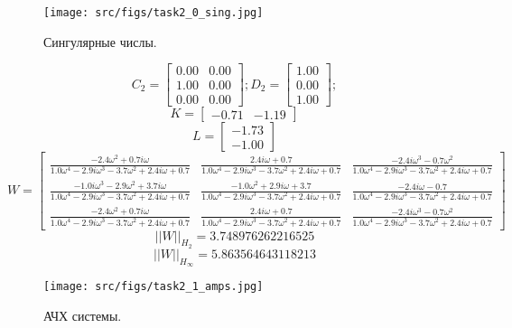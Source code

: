   \begin{figure}[ht!]
    \centering
    \texttt{[image: src/figs/task2\_0\_sing.jpg]}
    \caption{Сингулярные числы.}
    \label{fig:task2_0_sing}
  \end{figure}
  

  \[C_2 = \begin{bmatrix}
    0.00 &  0.00\\
    1.00 &  0.00\\
    0.00 &  0.00
  \end{bmatrix}; D_2 = \begin{bmatrix}
    1.00\\
    0.00\\
    1.00
  \end{bmatrix};\]
  \[K = \begin{bmatrix}
   -0.71 & -1.19
  \end{bmatrix}\]
  \[L = \begin{bmatrix}
   -1.73\\
   -1.00
  \end{bmatrix}\]
  \[W = \left[\begin{matrix}\frac{- 2.4 \omega^{2} + 0.7 i \omega}{1.0 \omega^{4} - 2.9 i \omega^{3} - 3.7 \omega^{2} + 2.4 i \omega + 0.7} & \frac{2.4 i \omega + 0.7}{1.0 \omega^{4} - 2.9 i \omega^{3} - 3.7 \omega^{2} + 2.4 i \omega + 0.7} & \frac{- 2.4 i \omega^{3} - 0.7 \omega^{2}}{1.0 \omega^{4} - 2.9 i \omega^{3} - 3.7 \omega^{2} + 2.4 i \omega + 0.7}\\\frac{- 1.0 i \omega^{3} - 2.9 \omega^{2} + 3.7 i \omega}{1.0 \omega^{4} - 2.9 i \omega^{3} - 3.7 \omega^{2} + 2.4 i \omega + 0.7} & \frac{- 1.0 \omega^{2} + 2.9 i \omega + 3.7}{1.0 \omega^{4} - 2.9 i \omega^{3} - 3.7 \omega^{2} + 2.4 i \omega + 0.7} & \frac{- 2.4 i \omega - 0.7}{1.0 \omega^{4} - 2.9 i \omega^{3} - 3.7 \omega^{2} + 2.4 i \omega + 0.7}\\\frac{- 2.4 \omega^{2} + 0.7 i \omega}{1.0 \omega^{4} - 2.9 i \omega^{3} - 3.7 \omega^{2} + 2.4 i \omega + 0.7} & \frac{2.4 i \omega + 0.7}{1.0 \omega^{4} - 2.9 i \omega^{3} - 3.7 \omega^{2} + 2.4 i \omega + 0.7} & \frac{- 2.4 i \omega^{3} - 0.7 \omega^{2}}{1.0 \omega^{4} - 2.9 i \omega^{3} - 3.7 \omega^{2} + 2.4 i \omega + 0.7}\end{matrix}\right]\]
  \[||W||_{H_2} = 3.748976262216525\]
  \[||W||_{H_\infty} = 5.863564643118213 \]

  \begin{figure}[ht!]
    \centering
    \texttt{[image: src/figs/task2\_1\_amps.jpg]}
    \caption{АЧХ системы.}
    \label{fig:task2_1_amps}
  \end{figure}
  

